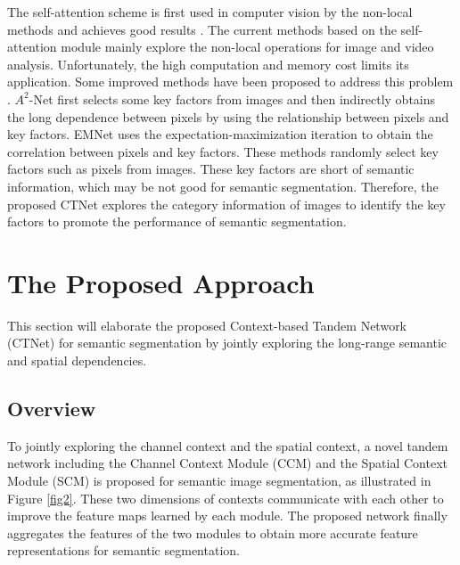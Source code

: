 \documentclass[10pt,journal,cspaper,compsoc]{IEEEtran}
\begin{document}
The self-attention scheme is first used in computer vision by the non-local methods and achieves good results \cite{wang2018non}. The current methods \cite{wang2018non, fu2019dual} based on the self-attention module mainly explore the non-local operations for image and video analysis. Unfortunately, the high computation and memory cost limits its application. Some improved methods have been proposed to address this problem \cite{huang2019ccnet, li2019expectation, chen20182, zhu2019asymmetric, yin2020disentangled}. $A^{2}$-Net \cite{chen20182} first selects some key factors from images and then indirectly obtains the long dependence between pixels by using the relationship between pixels and key factors. EMNet \cite{li2019expectation} uses the expectation-maximization iteration to obtain the correlation between pixels and key factors. These methods randomly select key factors such as pixels from images. These key factors are short of semantic information, which may be not good for semantic segmentation. Therefore, the proposed CTNet explores the category information of images to identify the key factors to promote the performance of semantic segmentation.
	
\section{The Proposed Approach}
This section will elaborate the proposed Context-based Tandem Network (CTNet) for semantic segmentation by jointly exploring the long-range semantic and spatial dependencies.


\subsection{Overview}
To jointly exploring the channel context and the spatial context, a novel tandem network including the Channel Context Module (CCM) and the Spatial Context Module (SCM) is proposed for semantic image segmentation, as illustrated in Figure \ref{fig2}. These two dimensions of contexts communicate with each other to improve the feature maps learned by each module. The proposed network finally aggregates the features of the two modules to obtain more accurate feature representations for semantic segmentation.
	
\end{document}
